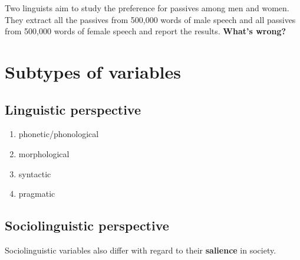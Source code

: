 \documentclass[
  11pt,
  letterpaper,
  DIV=11,
  numbers=noendperiod]{scrreprt}
\providecommand{\tightlist}{%
  \setlength{\itemsep}{0pt}\setlength{\parskip}{0pt}}\usepackage{longtable,booktabs,array}
\begin{document}
\begin{tcolorbox}[enhanced jigsaw, toprule=.15mm, opacitybacktitle=0.6, coltitle=black, arc=.35mm, colback=white, title=\textcolor{quarto-callout-caution-color}{\faFire}\hspace{0.5em}{Task}, titlerule=0mm, toptitle=1mm, bottomtitle=1mm, breakable, rightrule=.15mm, opacityback=0, bottomrule=.15mm, leftrule=.75mm, colframe=quarto-callout-caution-color-frame, left=2mm, colbacktitle=quarto-callout-caution-color!10!white]

Two linguists aim to study the preference for passives among men and
women. They extract all the passives from 500,000 words of male speech
and all passives from 500,000 words of female speech and report the
results. \textbf{What's wrong?}

\end{tcolorbox}

\section{Subtypes of variables}\label{subtypes-of-variables}

\subsection{Linguistic perspective}\label{linguistic-perspective}

\begin{enumerate}
\def\labelenumi{\arabic{enumi}.}
\tightlist
\item
  phonetic/phonological
\item
  morphological
\item
  syntactic
\item
  pragmatic
\end{enumerate}

\subsection{Sociolinguistic
perspective}\label{sociolinguistic-perspective}

Sociolinguistic variables also differ with regard to their
\textbf{salience} in society.
\end{document}
